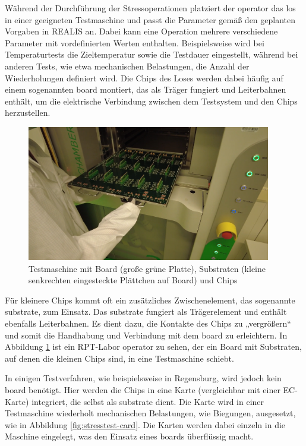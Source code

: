 Während der Durchführung der Stressoperationen platziert der \gls{operator} das \gls{los} in einer geeigneten Testmaschine und passt die Parameter gemäß den geplanten Vorgaben in \gls{REALIS} an. Dabei kann eine Operation mehrere verschiedene Parameter mit vordefinierten Werten enthalten. Beispielsweise wird bei Temperaturtests die Zieltemperatur sowie die Testdauer eingestellt, während bei anderen Tests, wie etwa mechanischen Belastungen, die Anzahl der Wiederholungen definiert wird. Die Chips des Loses werden dabei häufig auf einem sogenannten \gls{board} montiert, das als Träger fungiert und Leiterbahnen enthält, um die elektrische Verbindung zwischen dem Testsystem und den Chips herzustellen.

\begin{figure}[!htbp]
    \centering
    \includegraphics[width=0.95\textwidth]{bilder/testmaschine-with-board-substrate.png}
    \caption{Testmaschine mit Board (große grüne Platte), Substraten (kleine senkrechten eingesteckte Plättchen auf Board) und Chips \cite{RPTLaborIntern}}
    \label{fig:testmachine-with-board-substrate}
\end{figure}

Für kleinere Chips kommt oft ein zusätzliches Zwischenelement, das sogenannte \gls{substrate}, zum Einsatz. Das \gls{substrate} fungiert als Trägerelement und enthält ebenfalls Leiterbahnen. Es dient dazu, die Kontakte des Chips zu „vergrößern“ und somit die Handhabung und Verbindung mit dem \gls{board} zu erleichtern.
In Abbildung \ref{fig:testmachine-with-board-substrate} ist ein \gls{RPT}-Labor \gls{operator} zu sehen, der ein Board mit Substraten, auf denen die kleinen Chips sind, in eine Testmaschine schiebt.


In einigen Testverfahren, wie beispielsweise in Regensburg, wird jedoch kein \gls{board} benötigt. Hier werden die Chips in eine Karte (vergleichbar mit einer EC-Karte) integriert, die selbst als \gls{substrate} dient. Die Karte wird in einer Testmaschine wiederholt mechanischen Belastungen, wie Biegungen, ausgesetzt, wie in Abbildung \ref{fig:stresstest-card}. Die Karten werden dabei einzeln in die Maschine eingelegt, was den Einsatz eines \glspl{board} überflüssig macht.

